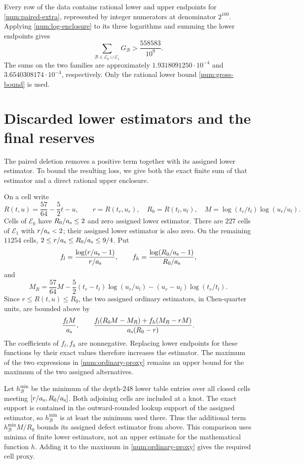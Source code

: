 Every row of the data contains rational lower and upper
endpoints for \eqref{num:paired-extra}, represented by
integer numerators at denominator $2^{160}$.  Applying
\eqref{num:log-enclosure} to its three logarithms and
summing the lower endpoints gives
\begin{equation}
 \sum_{\mathscr B\in \mathscr E_0\cup \mathscr E_1}G_{\mathscr B}>\frac{558583}{10^9}.
 \label{num:gross-bound}
\end{equation}
The sums on the two families are approximately
$1.9318091250\cdot10^{-4}$ and
$3.6540308174\cdot10^{-4}$, respectively. Only the rational
lower bound \eqref{num:gross-bound} is used.

\section{Discarded lower estimators and the final reserves}
\label{app:refinement-review}

The paired deletion removes a positive term together with its
assigned lower estimator. To bound the resulting loss, we give
both the exact finite sum of that estimator and a direct rational
upper enclosure.

On a cell write
\[
 R(t,u)=\frac{57}{64}-\frac52t-u,\qquad
 r=R(t_r,u_r),\quad R_0=R(t_l,u_l),\quad
 M=\log(t_r/t_l)\log(u_r/u_l).
\]
Cells of $\mathscr E_0$ have $R_0/{a_{\rm s}}\le2$ and zero assigned lower estimator.
There are $227$ cells of $\mathscr E_1$ with $r/{a_{\rm s}}<2$; their
assigned lower estimator is also zero.  On the remaining $11254$ cells,
$2\le r/{a_{\rm s}}\le R_0/{a_{\rm s}}\le9/4$.  Put
\[
 f_l=\frac{\log(r/{a_{\rm s}}-1)}{r/{a_{\rm s}}},\qquad
 f_h=\frac{\log(R_0/{a_{\rm s}}-1)}{R_0/{a_{\rm s}}},
\]
and
\[
 M_R=\frac{57}{64}M
 -\frac52(t_r-t_l)\log(u_r/u_l)
 -(u_r-u_l)\log(t_r/t_l).
\]
Since $r\le R(t,u)\le R_0$, the two assigned ordinary
estimators, in Chen-quarter units, are bounded above by
\begin{equation}
 \frac{f_lM}{{a_{\rm s}}},\qquad
 \frac{f_l(R_0M-M_R)+f_h(M_R-rM)}{a_{\rm s}(R_0-r)}.
 \label{num:ordinary-proxy}
\end{equation}
The coefficients of $f_l,f_h$ are nonnegative.
Replacing lower endpoints for these functions by their
exact values therefore increases the estimator.  The
maximum of the two expressions in
\eqref{num:ordinary-proxy} remains an upper bound for
the maximum of the two assigned alternatives.

Let $h_{\mathscr B}^{\min}$ be the minimum of the depth-$248$ lower table
entries over all closed cells meeting $[r/{a_{\rm s}},R_0/{a_{\rm s}}]$.
Both adjoining cells are included at a knot.  The exact
support is contained in the outward-rounded lookup
support of the assigned estimator, so $h_{\mathscr B}^{\min}$ is at least
the minimum used there.  Thus the additional term
$h_{\mathscr B}^{\min}M/R_0$ bounds its assigned defect estimator from above.
This comparison uses minima of finite lower estimators,
not an upper estimate for the mathematical function $h$.
Adding it to the maximum in
\eqref{num:ordinary-proxy} gives the required cell proxy.

